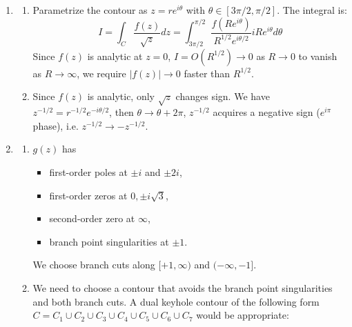 \documentclass[a4paper]{article}
\begin{document}
\newpage
\begin{ans}\leavevmode
\begin{enumerate}[label=(\alph*)]
\item 
\begin{enumerate}[label=(\roman*)]
\item Parametrize the contour as $z=re^{i\theta}$ with $\theta\in[3\pi/2,\pi/2]$. The integral is:
$$I=\int_C\frac{f(z)}{\sqrt{z}}dz=\int_{3\pi/2}^{\pi/2}\frac{f(Re^{i\theta})}{R^{1/2}e^{i\theta/2}}iRe^{i\theta}d\theta$$
Since $f(z)$ is analytic at $z=0$, $I=O(R^{1/2})\rightarrow 0$ as $R\rightarrow 0$ to vanish as $R\rightarrow\infty$, we require $|f(z)|\rightarrow 0$ faster than $R^{1/2}$.
\item Since $f(z)$ is analytic, only $\sqrt{z}$ changes sign. We have $z^{-1/2}=r^{-1/2}e^{-i\theta/2}$, then $\theta\rightarrow\theta+2\pi$, $z^{-1/2}$ acquires a negative sign ($e^{i\pi}$ phase), i.e. $z^{-1/2}\rightarrow -z^{-1/2}$.
\end{enumerate}
\item 
\begin{enumerate}[label=(\roman*)]
\item $g(z)$ has 
\begin{itemize}
    \item first-order poles at $\pm i$ and $\pm 2i$,
    \item first-order zeros at $0,\pm i\sqrt{3}$,
    \item second-order zero at $\infty$,
    \item branch point singularities at $\pm 1$.
\end{itemize}
We choose branch cuts along $[+1,\infty)$ and $(-\infty,-1]$.
\item We need to choose a contour that avoids the branch point singularities and both branch cuts. A dual keyhole contour of the following form $C=C_1\cup C_2\cup C_3\cup C_4\cup C_5\cup C_6\cup C_7$ would be appropriate:
 \begin{center}
\end{center}
\end{enumerate}
\end{enumerate}
\end{ans}
\end{document}
